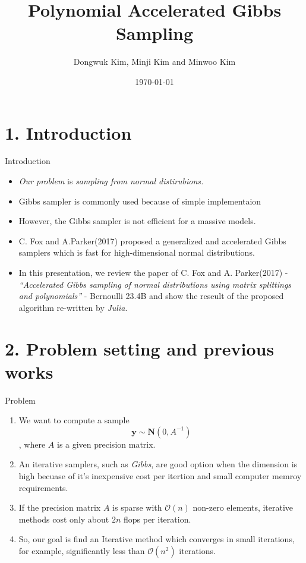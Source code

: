 \documentclass[10pt]{beamer}
\title[Polynomial Acclerated Gibbs Sampling] 
{Polynomial Accelerated Gibbs Sampling}
\author[김동욱, 김민지, 김민우] 
{Dongwuk Kim, Minji Kim and Minwoo Kim}
\institute[SNU]{Seoul National University}
\date[\today]{\today}
\begin{document}
\begin{frame}
  \titlepage
\end{frame}

 
\section{1. Introduction}
\begin{frame}{Introduction}
    \begin{itemize}
        \item \emph{Our problem} is \emph{\color{blue}sampling from normal distirubions.}
        \item Gibbs sampler is commonly used because of simple implementaion 
        \item However, the Gibbs sampler is not efficient for a massive models.
        \item C. Fox and A.Parker(2017) proposed a generalized and accelerated Gibbs samplers which is fast for high-dimensional normal distributions.
        \item In this presentation, we review the paper of C. Fox and A. Parker(2017)
        - \emph{\color{blue}“Accelerated Gibbs sampling of normal distributions using matrix 
        splittings and polynomials”} -  Bernoulli 23.4B
        and show the reseult of the proposed algorithm re-written by \textit{Julia}.
    \end{itemize}
\end{frame}


\section{2. Problem setting and previous works}

\begin{frame}{Problem}
\begin{enumerate}
    \item We want to compute a sample
       $$
       \mathbf{y} \sim \mathbf{N}(0, A^{-1})
       $$
       , where $A$ is a given precision matrix. 
    \item An iterative samplers, such as \emph{\color{blue}Gibbs}, are good option when the dimension is high becuase of it's inexpensive cost per itertion and small computer memroy requirements. 
    \item If the precision matrix $A$ is sparse with $\mathcal{O}(n)$ non-zero elements, iterative methods cost only about $2n$ flops per iteration.
    \item So, our goal is find an Iterative method which converges in small iterations, for example, significantly less than $\mathcal{O}(n^2)$ iterations.
\end{enumerate}
\end{frame}
\end{document}
